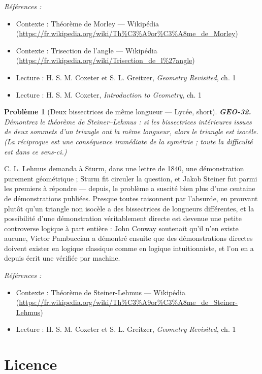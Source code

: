 \documentclass[11pt]{article}
\newtheorem{problem}{Problème}
\newenvironment{refs}{\par\small\noindent\emph{Références :}\begin{itemize}\setlength\itemsep{0pt}}{\end{itemize}\normalsize}
\begin{document}
\begin{refs}
\item Contexte : Théorème de Morley --- Wikipédia (\url{https://fr.wikipedia.org/wiki/Th%C3%A9or%C3%A8me_de_Morley})
\item Contexte : Trisection de l'angle --- Wikipédia (\url{https://fr.wikipedia.org/wiki/Trisection_de_l%27angle})
\item Lecture : H. S. M. Coxeter et S. L. Greitzer, \textit{Geometry Revisited}, ch. 1
\item Lecture : H. S. M. Coxeter, \textit{Introduction to Geometry}, ch. 1
\end{refs}

\bigskip

\begin{problem}[{Deux bissectrices de même longueur --- Lycée, short}]
\textbf{GEO-32.} Démontrez le théorème de Steiner--Lehmus : si les bissectrices
intérieures issues de deux sommets d'un triangle ont la même longueur, alors le triangle est
isocèle. (La réciproque est une conséquence immédiate de la symétrie ; toute la difficulté est dans
ce sens-ci.)
\end{problem}

\noindent C. L. Lehmus demanda à Sturm, dans une lettre de 1840, une démonstration purement
géométrique ; Sturm fit circuler la question, et Jakob Steiner fut parmi les premiers à répondre ---
depuis, le problème a suscité bien plus d'une centaine de démonstrations publiées. Presque toutes
raisonnent par l'absurde, en prouvant plutôt qu'un triangle non isocèle a des bissectrices de
longueurs différentes, et la possibilité d'une démonstration véritablement \og{} directe \fg{} est devenue
une petite controverse logique à part entière : John Conway soutenait qu'il n'en existe aucune,
Victor Pambuccian a démontré ensuite que des démonstrations directes doivent exister en logique
classique comme en logique intuitionniste, et l'on en a depuis écrit une vérifiée par
machine.

\begin{refs}
\item Contexte : Théorème de Steiner-Lehmus --- Wikipédia (\url{https://fr.wikipedia.org/wiki/Th%C3%A9or%C3%A8me_de_Steiner-Lehmus})
\item Lecture : H. S. M. Coxeter et S. L. Greitzer, \textit{Geometry Revisited}, ch. 1
\end{refs}

\bigskip


\section*{Licence}
\end{document}
